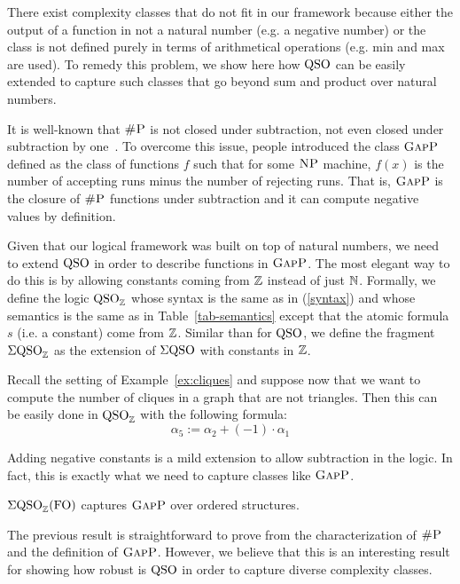 
There exist complexity classes that do not fit in our framework because either the output of a function in not a natural number (e.g. a negative number) or the class is not defined purely in terms of arithmetical operations (e.g. min and max are used).
To remedy this problem, we show here how ${\rm QSO}$ can be easily extended  to capture such classes that go beyond sum and product over natural numbers. 

It is well-known that $\text{\sc \#P}$ is not closed under subtraction, not even closed under subtraction by one~\cite{OH93}.
To overcome this issue, people introduced the class $\text{\sc GapP}$~\cite{fenner1994gap} defined as the class of functions $f$ such that for some $\text{\sc NP}$ machine, $f(x)$ is the number of accepting runs minus the number of rejecting runs.
That is, $\text{\sc GapP}$ is the closure of $\text{\sc \#P}$ functions under subtraction and it can compute negative values by definition. 

Given that our logical framework was built on top of natural numbers, we need to extend ${\rm QSO}$ in order to describe functions in $\text{\sc GapP}$. 
The most elegant way to do this is by allowing constants coming from $\mathbb{Z}$ instead of just $\mathbb{N}$. 
Formally, we define the logic ${\rm QSO}_{\mathbb{Z}}$ whose syntax is the same as in (\ref{syntax}) and whose semantics is the same as in Table~\ref{tab-semantics} except that the atomic formula $s$ (i.e. a constant) come from $\mathbb{Z}$.  
Similar than for ${\rm QSO}$, we define the fragment $\Sigma{\rm QSO}_{\mathbb{Z}}$ as the extension of $\Sigma{\rm QSO}$ with constants in $\mathbb{Z}$.
\begin{example}
	Recall the setting of Example~\ref{ex:cliques} and suppose now that we want to compute the number of cliques in a graph that are not triangles. Then this can be easily done in ${\rm QSO}_{\mathbb{Z}}$ with the following formula:
	\[
	\alpha_5 :=	\alpha_2 + (-1) \cdot \alpha_1 
	\]
\end{example}
Adding negative constants is a mild extension to allow subtraction in the logic. 
In fact, this is exactly what we need to capture classes like $\text{\sc GapP}$.
\begin{proposition} \label{prop:capture-gapp}
	$\Sigma{\rm QSO}_{\mathbb{Z}}({\rm FO})$ captures $\text{\sc GapP}$ over ordered structures.
\end{proposition}
The previous result is straightforward to prove from the characterization of $\text{\sc \#P}$ and the definition of $\text{\sc GapP}$. 
However, we believe that this is an interesting result for showing how robust is ${\rm QSO}$ in order to capture diverse complexity classes.

